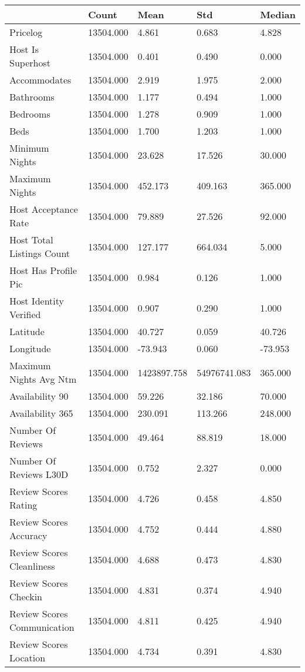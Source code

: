 \begin{tabular}{lllll}
\toprule
 & Count & Mean & Std & Median \\
\midrule
Pricelog & 13504.000 & 4.861 & 0.683 & 4.828 \\
Host Is Superhost & 13504.000 & 0.401 & 0.490 & 0.000 \\
Accommodates & 13504.000 & 2.919 & 1.975 & 2.000 \\
Bathrooms & 13504.000 & 1.177 & 0.494 & 1.000 \\
Bedrooms & 13504.000 & 1.278 & 0.909 & 1.000 \\
Beds & 13504.000 & 1.700 & 1.203 & 1.000 \\
Minimum Nights & 13504.000 & 23.628 & 17.526 & 30.000 \\
Maximum Nights & 13504.000 & 452.173 & 409.163 & 365.000 \\
Host Acceptance Rate & 13504.000 & 79.889 & 27.526 & 92.000 \\
Host Total Listings Count & 13504.000 & 127.177 & 664.034 & 5.000 \\
Host Has Profile Pic & 13504.000 & 0.984 & 0.126 & 1.000 \\
Host Identity Verified & 13504.000 & 0.907 & 0.290 & 1.000 \\
Latitude & 13504.000 & 40.727 & 0.059 & 40.726 \\
Longitude & 13504.000 & -73.943 & 0.060 & -73.953 \\
Maximum Nights Avg Ntm & 13504.000 & 1423897.758 & 54976741.083 & 365.000 \\
Availability 90 & 13504.000 & 59.226 & 32.186 & 70.000 \\
Availability 365 & 13504.000 & 230.091 & 113.266 & 248.000 \\
Number Of Reviews & 13504.000 & 49.464 & 88.819 & 18.000 \\
Number Of Reviews L30D & 13504.000 & 0.752 & 2.327 & 0.000 \\
Review Scores Rating & 13504.000 & 4.726 & 0.458 & 4.850 \\
Review Scores Accuracy & 13504.000 & 4.752 & 0.444 & 4.880 \\
Review Scores Cleanliness & 13504.000 & 4.688 & 0.473 & 4.830 \\
Review Scores Checkin & 13504.000 & 4.831 & 0.374 & 4.940 \\
Review Scores Communication & 13504.000 & 4.811 & 0.425 & 4.940 \\
Review Scores Location & 13504.000 & 4.734 & 0.391 & 4.830 \\

\end{tabular}
